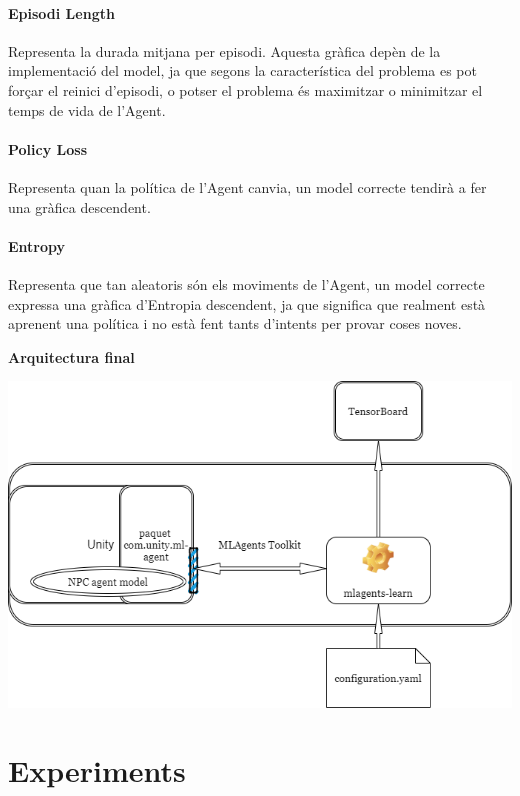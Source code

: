 \documentclass{article}
\begin{document}
    \paragraph{Episodi Length}
    Representa la durada mitjana per episodi. Aquesta gràfica depèn de la implementació del model, ja que segons la característica del problema es pot forçar el reinici d'episodi, o potser el problema és maximitzar o minimitzar el temps de vida de l'Agent.
    
    \paragraph{Policy Loss}
    Representa quan la política de l'Agent canvia, un model correcte tendirà a fer una gràfica descendent.
    
    \paragraph{Entropy}
    Representa que tan aleatoris són els moviments de l'Agent, un model correcte expressa una gràfica d'Entropia descendent, ja que significa que realment està aprenent una política i no està fent tants d'intents per provar coses noves.
    
    \newpage
    
    \textbf{Arquitectura final}
    
    \includegraphics[width=\textwidth]{images/arquitectura-tools.drawio.png} 
    
    \newpage
    
    \section{Experiments}
    
\end{document}
